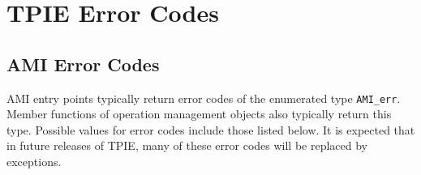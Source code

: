 
\chapter{TPIE Error Codes}

\section{AMI Error Codes}
\label{sec:ami-errors}

AMI entry points typically return error codes of the
enumerated type \lstinline|AMI_err|.  Member functions of operation management
objects also typically return this
type.  Possible values for error codes include those listed below.  It is
expected that in future releases of TPIE, many of these error codes will be
replaced by exceptions.  

